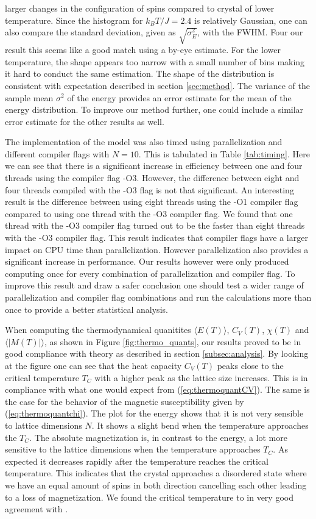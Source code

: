\documentclass[twocolumn]{aastex62}
\begin{document}
larger changes in the configuration of spins compared to crystal of lower
temperature. Since the histogram for $k_BT/J=2.4$ is relatively Gaussian, one can also compare the
standard deviation, given as $\sqrt{\sigma_E^2}$, with the FWHM. Four our result
this seems like a good match using a by-eye estimate. For the lower temperature, the
shape appears too narrow with a small number of bins making it hard to conduct
the same estimation. The shape of the distribution is consistent with
expectation described in section \ref{sec:method}. The variance of the sample mean $\sigma^2$ of the energy
provides an error estimate for the mean of the energy distribution. To improve
our method further, one could include a similar error estimate for the other
results as well.

The implementation of the model was also timed using parallelization and
different compiler flags with $N=10$. This is tabulated in Table
\ref{tab:timing}. Here we can see that there is a significant increase in
efficiency between one and four threads using the compiler flag -O3. However,
the difference between eight and four threads compiled with the -O3 flag is not
that significant. An interesting result is the difference between using eight
threads using the -O1 compiler flag compared to using one thread with the -O3
compiler flag. We found that one thread with the -O3 compiler flag turned out to
be the faster than eight threads with the -O3 compiler flag. This result
indicates that compiler flags have a larger impact on CPU time than
parallelization. However parallelization also provides a significant increase in
performance. Our results however were only produced computing once for every
combination of parallelization and compiler flag. To improve this result and
draw a safer conclusion one should test a wider range of parallelization and
compiler flag combinations and run the calculations more than once to provide a
better statistical analysis.

When computing the thermodynamical quanitites $\langle E(T) \rangle$,  $C_V(T)$,
$\chi(T)$ and $\langle \vert M(T) \vert \rangle$, as shown in Figure
\ref{fig:thermo_quants}, our results proved to be in good compliance with theory
as described in section \ref{subsec:analysis}. By looking at the figure one can
see that the heat capacity $C_V(T)$ peaks close to the critical temperature
$T_C$ with a higher peak as the lattice size increases. This is in compliance
with what one would expect from (\ref{eq:thermoquantCV}). The same is the case
for the behavior of the magnetic susceptibility given by
(\ref{eq:thermoquantchi}). The plot for the energy shows that it is not very
sensible to lattice dimensions $N$. It shows a slight bend when the temperature
approaches the $T_C$. The absolute magnetization is, in contrast to the energy,
a lot more sensitive to the lattice dimensions when the temperature approaches
$T_C$. As expected it decreases rapidly after the temperature reaches the
critical temperature. This indicates that the crystal approaches a disordered
state where we have an equal amount of spins in both direction cancelling each
other leading to a loss of magnetization. We found the critical temperature to
in very good agreement with \cite{onsager:1944}.
\end{document}
